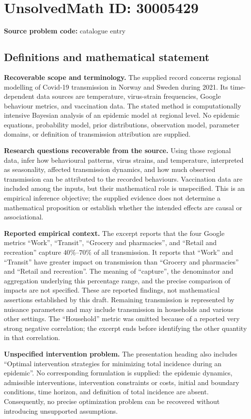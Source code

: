 \documentclass[11pt]{article}
\begin{document}
\section*{UnsolvedMath ID: 30005429}
\textbf{Source problem code:} catalogue entry
\subsection{Definitions and mathematical statement}
\textbf{Recoverable scope and terminology.} The supplied record concerns regional modelling of Covid-19 transmission in Norway and Sweden during 2021. Its time-dependent data sources are temperature, virus-strain frequencies, Google behaviour metrics, and vaccination data. The stated method is computationally intensive Bayesian analysis of an epidemic model at regional level. No epidemic equations, probability model, prior distributions, observation model, parameter domains, or definition of transmission attribution are supplied.

\textbf{Research questions recoverable from the source.} Using those regional data, infer how behavioural patterns, virus strains, and temperature, interpreted as seasonality, affected transmission dynamics, and how much observed transmission can be attributed to the recorded behaviours. Vaccination data are included among the inputs, but their mathematical role is unspecified. This is an empirical inference objective; the supplied evidence does not determine a mathematical proposition or establish whether the intended effects are causal or associational.

\textbf{Reported empirical context.} The excerpt reports that the four Google metrics ``Work'', ``Transit'', ``Grocery and pharmacies'', and ``Retail and recreation'' capture \(40\%\text{--}70\%\) of all transmission. It reports that ``Work'' and ``Transit'' have greater impact on transmission than ``Grocery and pharmacies'' and ``Retail and recreation''. The meaning of ``capture'', the denominator and aggregation underlying this percentage range, and the precise comparison of impacts are not specified. These are reported findings, not mathematical assertions established by this draft. Remaining transmission is represented by nuisance parameters and may include transmission in households and various other settings. The ``Household'' metric was omitted because of a reported very strong negative correlation; the excerpt ends before identifying the other quantity in that correlation.

\textbf{Unspecified intervention problem.} The presentation heading also includes ``Optimal intervention strategies for minimizing total incidence during an epidemic''. No corresponding formulation is supplied: the epidemic dynamics, admissible interventions, intervention constraints or costs, initial and boundary conditions, time horizon, and definition of total incidence are absent. Consequently, no precise optimization problem can be recovered without introducing unsupported assumptions.
\end{document}
